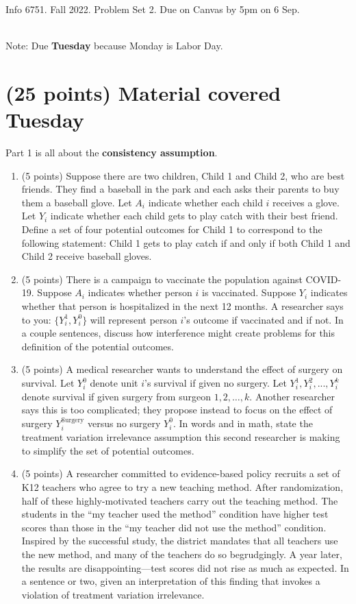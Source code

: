 \documentclass[10pt]{article}
\begin{document}
\begin{Large} 
Info 6751. Fall 2022. Problem Set 2. Due on Canvas by 5pm on 6 Sep.
\end{Large} \\
Note: Due \textbf{Tuesday} because Monday is Labor Day.
\hline

\section{(25 points) Material covered Tuesday}
Part 1 is all about the \textbf{consistency assumption}.
\begin{enumerate}
    \item (5 points) Suppose there are two children, Child 1 and Child 2, who are best friends. They find a baseball in the park and each asks their parents to buy them a baseball glove. Let $A_i$ indicate whether each child $i$ receives a glove. Let $Y_i$ indicate whether each child gets to play catch with their best friend. Define a set of four potential outcomes for Child 1 to correspond to the following statement: Child 1 gets to play catch if and only if both Child 1 and Child 2 receive baseball gloves.
    \item (5 points) There is a campaign to vaccinate the population against COVID-19. Suppose $A_i$ indicates whether person $i$ is vaccinated. Suppose $Y_i$ indicates whether that person is hospitalized in the next 12 months. A researcher says to you: $\{Y_i^1,Y_i^0\}$ will represent person $i$'s outcome if vaccinated and if not. In a couple sentences, discuss how interference might create problems for this definition of the potential outcomes.
    \item (5 points) A medical researcher wants to understand the effect of surgery on survival. Let $Y_i^0$ denote unit $i$'s survival if given no surgery. Let $Y_i^1,Y_i^2,...,Y_i^k$ denote survival if given surgery from surgeon $1,2,\dots,k$. Another researcher says this is too complicated; they propose instead to focus on the effect of surgery $Y_i^\text{Surgery}$ versus no surgery $Y_i^0$. In words and in math, state the treatment variation irrelevance assumption this second researcher is making to simplify the set of potential outcomes.
    \item (5 points) A researcher committed to evidence-based policy recruits a set of K12 teachers who agree to try a new teaching method. After randomization, half of these highly-motivated teachers carry out the teaching method. The students in the ``my teacher used the method'' condition have higher test scores than those in the ``my teacher did not use the method'' condition. Inspired by the successful study, the district mandates that all teachers use the new method, and many of the teachers do so begrudgingly. A year later, the results are disappointing---test scores did not rise as much as expected. In a sentence or two, given an interpretation of this finding that invokes a violation of treatment variation irrelevance.

\end{enumerate}
\end{document}
